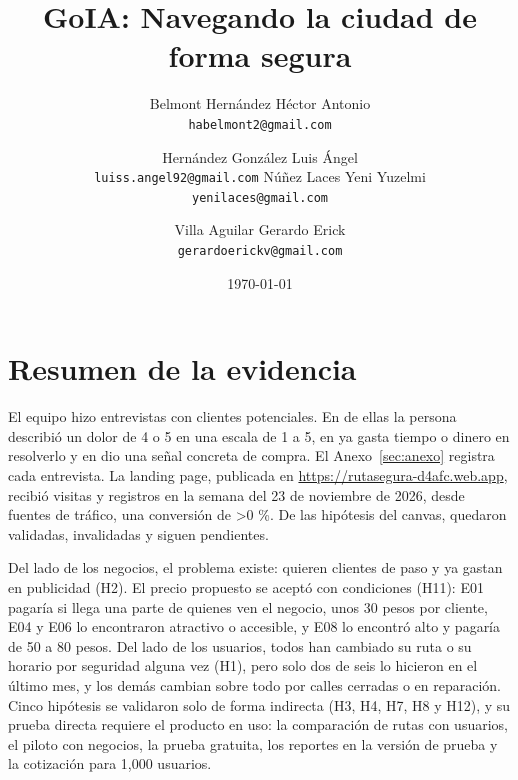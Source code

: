 \documentclass[11pt]{article}
\title{GoIA: Navegando la ciudad de forma segura}
\author{%
  Belmont Hernández Héctor Antonio\\ {\small\texttt{habelmont2@gmail.com}}
  \and
  Hernández González Luis Ángel\\ {\small\texttt{luiss.angel92@gmail.com}}
  \otrorenglon
  Núñez Laces Yeni Yuzelmi\\ {\small\texttt{yenilaces@gmail.com}}
  \and
  Villa Aguilar Gerardo Erick\\ {\small\texttt{gerardoerickv@gmail.com}}
}
\date{\today}
\newcounter{nent}\newcounter{ndolor}\newcounter{npaga}\newcounter{npagaria}
\newcounter{nval}\newcounter{ninval}\newcounter{npend}
\newcounter{nsem}\newcounter{nlan}\def\totVis{0}\def\totReg{0}
\begin{document}
\maketitle
\thispagestyle{empty}


\section{Resumen de la evidencia}
\label{sec:resumen}

El equipo hizo \thenent{} entrevistas con clientes potenciales. En \thendolor{} de ellas la
persona describió un dolor de 4 o 5 en una escala de 1 a 5, en \thenpaga{} ya gasta tiempo o
dinero en resolverlo y en \thenpagaria{} dio una señal concreta de compra. El
Anexo~\ref{sec:anexo} registra cada entrevista. La landing page, publicada en
\url{https://rutasegura-d4afc.web.app}, recibió \totVis{} visitas y \totReg{} registros en la
semana del 23 de noviembre de 2026, desde \thensem{} fuentes de tráfico, una conversión de
\ifnum\totVis>0 \fi\%. De las hipótesis del canvas,
\thenval{} quedaron validadas, \theninval{} invalidadas y \thenpend{} siguen pendientes.

Del lado de los negocios, el problema existe: quieren clientes de paso y ya gastan en publicidad
(H2). El precio propuesto se aceptó con condiciones (H11): E01 pagaría si llega una parte de quienes
ven el negocio, unos 30 pesos por cliente, E04 y E06 lo encontraron atractivo o accesible, y E08 lo
encontró alto y pagaría de 50 a 80 pesos. Del lado de los usuarios, todos han cambiado su ruta o su
horario por seguridad alguna vez (H1), pero solo dos de seis lo hicieron en el último mes, y los
demás cambian sobre todo por calles cerradas o en reparación. Cinco hipótesis se validaron solo de
forma indirecta (H3, H4, H7, H8 y H12), y su prueba directa requiere el producto en uso: la
comparación de rutas con usuarios, el piloto con negocios, la prueba gratuita, los reportes en la
versión de prueba y la cotización para 1,000 usuarios.
\end{document}
